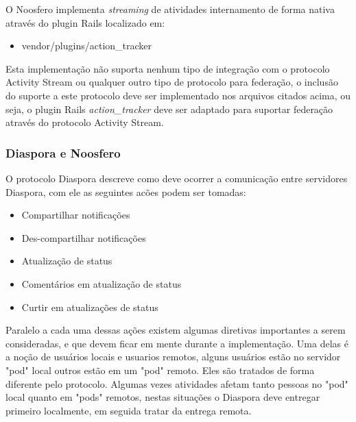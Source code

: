 \documentclass[12pt]{article}
\begin{document}
O Noosfero implementa {\it streaming} de atividades internamento de forma
nativa através do plugin Rails localizado em:

\begin{itemize}
  \item vendor/plugins/action\_tracker
\end{itemize}

Esta implementação não suporta nenhum tipo de integração com o protocolo
Activity Stream ou qualquer outro tipo de protocolo para federação, o inclusão
do suporte a este protocolo deve ser implementado nos arquivos citados acima,
ou seja, o plugin Rails {\it action\_tracker} deve ser adaptado para suportar
federação através do protocolo Activity Stream.


\subsubsection{Diaspora e Noosfero}

O protocolo Diaspora descreve como deve ocorrer a comunicação entre servidores
Diaspora, com ele as seguintes acões podem ser tomadas:

\begin{itemize}
  \item Compartilhar notificações
  \item Des-compartilhar notificações
  \item Atualização de status
  \item Comentários em atualização de status
  \item Curtir em atualizações de status
\end{itemize}

Paralelo a cada uma dessas ações existem algumas diretivas importantes a serem
consideradas, e que devem ficar em mente durante a implementação. Uma delas é
a noção de usuários locais e usuarios remotos, alguns usuários estão no servidor
"pod" local outros estão em um "pod" remoto. Eles são tratados de forma
diferente pelo protocolo. Algumas vezes atividades afetam tanto pessoas no
"pod" local quanto em "pods" remotos, nestas situações o Diaspora deve entregar
primeiro localmente, em seguida tratar da entrega remota.
\end{document}

